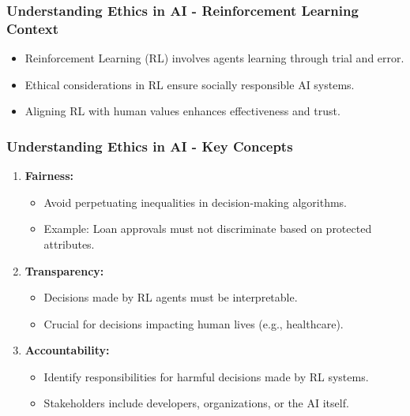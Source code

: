 \documentclass{beamer}
\begin{document}
\begin{frame}[fragile]
    \frametitle{Understanding Ethics in AI - Reinforcement Learning Context}
    \begin{itemize}
        \item Reinforcement Learning (RL) involves agents learning through trial and error.
        \item Ethical considerations in RL ensure socially responsible AI systems.
        \item Aligning RL with human values enhances effectiveness and trust.
    \end{itemize}
\end{frame}

\begin{frame}[fragile]
    \frametitle{Understanding Ethics in AI - Key Concepts}
    \begin{enumerate}
        \item \textbf{Fairness:}
            \begin{itemize}
                \item Avoid perpetuating inequalities in decision-making algorithms.
                \item Example: Loan approvals must not discriminate based on protected attributes.
            \end{itemize}
        \item \textbf{Transparency:}
            \begin{itemize}
                \item Decisions made by RL agents must be interpretable.
                \item Crucial for decisions impacting human lives (e.g., healthcare).
            \end{itemize}
        \item \textbf{Accountability:}
            \begin{itemize}
                \item Identify responsibilities for harmful decisions made by RL systems.
                \item Stakeholders include developers, organizations, or the AI itself.
            \end{itemize}
    \end{enumerate}
\end{frame}
\end{document}
